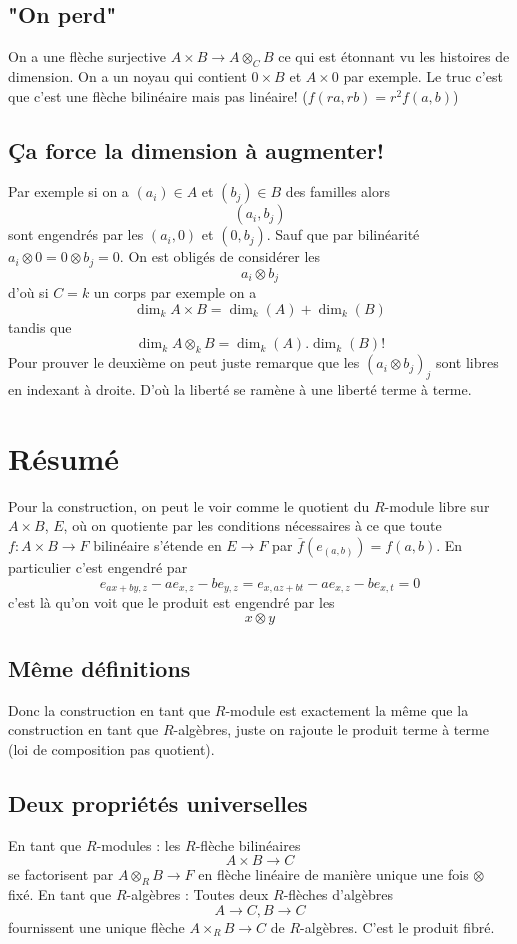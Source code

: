 \documentclass[a4paper,12pt]{book}
\theoremstyle{plain}
\theoremstyle{definition}
\theoremstyle{remark}
\begin{document}
\subsection{"On perd"}
On a une flèche surjective $A\times B\to A\otimes_C B$ ce qui est
étonnant vu les histoires de dimension. On a un noyau qui contient
$0\times B$ et $A\times 0$ par exemple. Le truc c'est que c'est
une flèche bilinéaire mais pas linéaire! ($f(ra,rb)=r^2f(a,b)$)

\subsection{Ça force la dimension à augmenter!}
Par exemple si on a 
$(a_i)\in A$ et $(b_j)\in B$ des familles alors 
\[(a_i, b_j)\]
sont engendrés par les $(a_i,0)$ et $(0,b_j)$. Sauf que par 
bilinéarité $a_i\otimes 0=0\otimes b_j=0$. On est obligés de
considérer les 
\[a_i\otimes b_j\]
d'où si $C=k$ un corps par exemple on a 
\[\dim_k A\times B=\dim_k (A)+\dim_k(B)\]
tandis que
\[\dim_k A\otimes_k B=\dim_k(A).\dim_k(B)!\]
Pour prouver le deuxième on peut juste remarque que
les $(a_i\otimes b_j)_j$ sont libres en indexant à droite. D'où
la liberté se ramène à une liberté terme à terme.
\section{Résumé}
Pour la construction, on peut le voir comme le quotient du 
$R$-module libre sur $A\times B$, $E$, où on quotiente par les 
conditions nécessaires à ce que toute $f\colon A\times B\to F$
bilinéaire s'étende en $E\to F$ par $\bar f(e_{(a,b)})=f(a,b)$.
En particulier c'est engendré par 
\[e_{ax+by,z}-ae_{x,z}-be_{y,z}=e_{x,az+bt}-ae_{x,z}-be_{x,t}=0\]
c'est là qu'on voit que le produit est engendré par les
\[x\otimes y\]


\subsection{Même définitions}
Donc la construction en tant que $R$-module est exactement
la même que la construction en tant que $R$-algèbres, juste 
on rajoute le produit terme à terme (loi de composition
pas quotient).
\subsection{Deux propriétés universelles}
En tant que $R$-modules : les $R$-flèche bilinéaires
\[A\times B\to C\]
se factorisent par $A\otimes_R B\to F$ en flèche linéaire de 
manière unique une fois $\otimes$ fixé.
En tant que $R$-algèbres : Toutes deux $R$-flèches d'algèbres
\[A\to C, B\to C\]
fournissent une unique flèche $A\times_R B\to C$ de $R$-algèbres.
C'est le produit fibré. 
\end{document}

